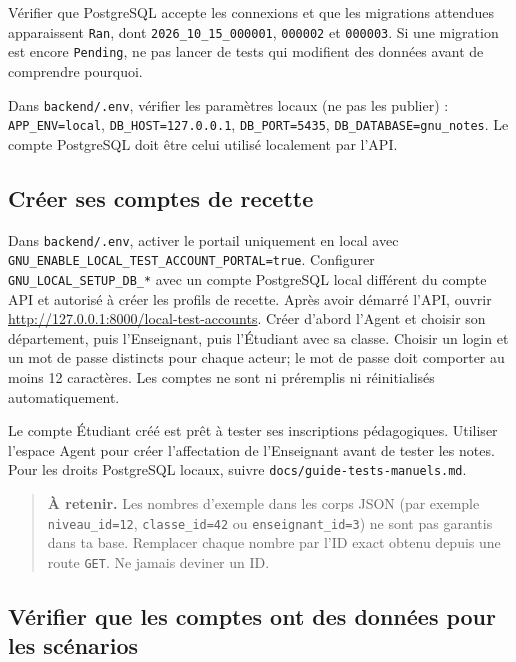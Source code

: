 \documentclass[10pt,a4paper]{article}
\newcommand{\note}[1]{\begin{quote}\colorbox{gnuPale}{\parbox{0.94\linewidth}{\textbf{À retenir. }#1}}\end{quote}}
\begin{document}
Vérifier que PostgreSQL accepte les connexions et que les migrations attendues apparaissent \texttt{Ran}, dont \texttt{2026\_10\_15\_000001}, \texttt{000002} et \texttt{000003}. Si une migration est encore \texttt{Pending}, ne pas lancer de tests qui modifient des données avant de comprendre pourquoi.

Dans \texttt{backend/.env}, vérifier les paramètres locaux (ne pas les publier) : \texttt{APP\_ENV=local}, \texttt{DB\_HOST=127.0.0.1}, \texttt{DB\_PORT=5435}, \texttt{DB\_DATABASE=gnu\_notes}. Le compte PostgreSQL doit être celui utilisé localement par l’API.

\subsection{Créer ses comptes de recette}

Dans \texttt{backend/.env}, activer le portail uniquement en local avec \texttt{GNU\_ENABLE\_LOCAL\_TEST\_ACCOUNT\_PORTAL=true}. Configurer \texttt{GNU\_LOCAL\_SETUP\_DB\_*} avec un compte PostgreSQL local différent du compte API et autorisé à créer les profils de recette. Après avoir démarré l’API, ouvrir \url{http://127.0.0.1:8000/local-test-accounts}. Créer d’abord l’Agent et choisir son département, puis l’Enseignant, puis l’Étudiant avec sa classe. Choisir un login et un mot de passe distincts pour chaque acteur; le mot de passe doit comporter au moins 12 caractères. Les comptes ne sont ni préremplis ni réinitialisés automatiquement.

Le compte Étudiant créé est prêt à tester ses inscriptions pédagogiques. Utiliser l’espace Agent pour créer l’affectation de l’Enseignant avant de tester les notes. Pour les droits PostgreSQL locaux, suivre \texttt{docs/guide-tests-manuels.md}.

\note{Les nombres d’exemple dans les corps JSON (par exemple \texttt{niveau\_id=12}, \texttt{classe\_id=42} ou \texttt{enseignant\_id=3}) ne sont pas garantis dans ta base. Remplacer chaque nombre par l’ID exact obtenu depuis une route \texttt{GET}. Ne jamais deviner un ID.}

\subsection{Vérifier que les comptes ont des données pour les scénarios}
\end{document}
